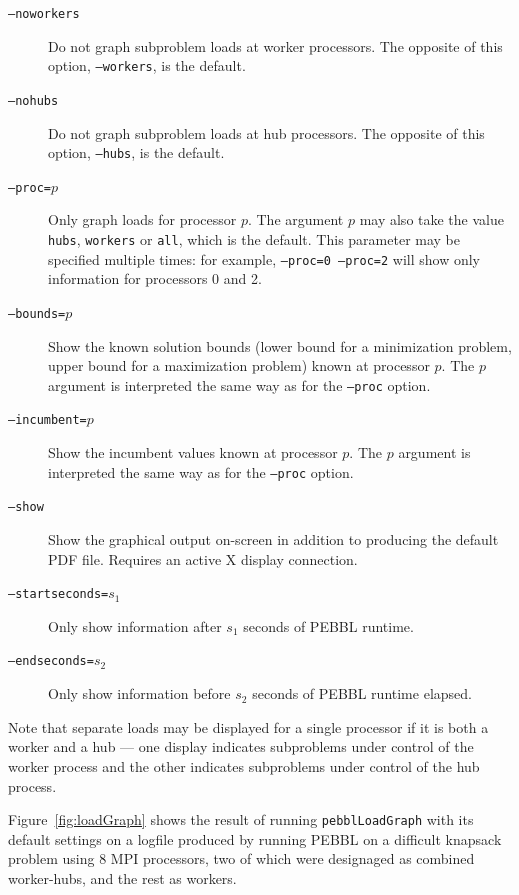\begin{description}
\item[\texttt{--noworkers}] Do not graph subproblem loads at worker
  processors.  The opposite of this option, \texttt{--workers}, is the
  default.
\item[\texttt{--nohubs}] Do not graph subproblem loads at hub
  processors.  The opposite of this option, \texttt{--hubs}, is the
  default.
\item[\texttt{--proc=}$p$]  Only graph loads for processor $p$.  The
  argument $p$ may also take the value \texttt{hubs}, \texttt{workers}
  or \texttt{all}, which is the default.  This parameter may be
  specified multiple times: for example, \texttt{--proc=0 --proc=2}
  will show only information for processors 0 and 2.
\item[\texttt{--bounds=}$p$] Show the known solution bounds (lower
  bound for a minimization problem, upper bound for a maximization
  problem) known at processor $p$.  The $p$ argument is interpreted
  the same way as for the \texttt{--proc} option.
\item[\texttt{--incumbent=}$p$] Show the incumbent values known at
  processor $p$.  The $p$ argument is interpreted the same way as for
  the \texttt{--proc} option.
\item[\texttt{--show}] Show the graphical output on-screen in addition
  to producing the default PDF file.  Requires an active X display
  connection.
\item[\texttt{--startseconds=}$s_1$]  Only show information after
  $s_1$ seconds of PEBBL runtime.
\item[\texttt{--endseconds=}$s_2$]  Only show information before
  $s_2$ seconds of PEBBL runtime elapsed.
\end{description}
Note that separate loads may be displayed for a single processor if it
is both a worker and a hub --- one display indicates subproblems under
control of the worker process and the other indicates subproblems
under control of the hub process.

Figure~\ref{fig:loadGraph} shows the result of running
\texttt{pebblLoadGraph} with its default settings on a logfile
produced by running PEBBL on a difficult knapsack problem using 8 MPI
processors, two of which were designaged as combined worker-hubs, and
the rest as workers.

